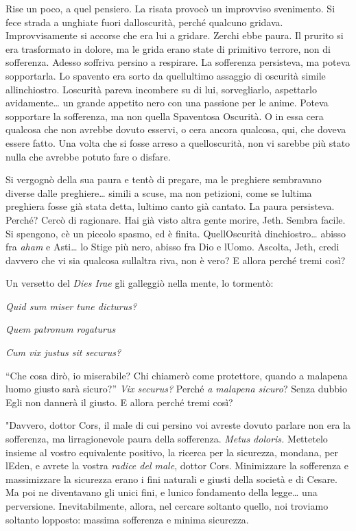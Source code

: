 Rise un poco, a quel pensiero. La risata provocò un improvviso
svenimento. Si fece strada a unghiate fuori
dall\textquotesingle oscurità, perché qualcuno gridava. Improvvisamente
si accorse che era lui a gridare. Zerchi ebbe paura. Il prurito si era
trasformato in dolore, ma le grida erano state di primitivo terrore, non
di sofferenza. Adesso soffriva persino a respirare. La sofferenza
persisteva, ma poteva sopportarla. Lo spavento era sorto da
quell\textquotesingle ultimo assaggio di oscurità simile
all\textquotesingle inchiostro. L\textquotesingle oscurità pareva
incombere su di lui, sorvegliarlo, aspettarlo avidamente\ldots{} un
grande appetito nero con una passione per le anime. Poteva sopportare la
sofferenza, ma non quella Spaventosa Oscurità. O in essa
c\textquotesingle era qualcosa che non avrebbe dovuto esservi, o
c\textquotesingle era ancora qualcosa, qui, che doveva essere fatto. Una
volta che si fosse arreso a quell\textquotesingle oscurità, non vi
sarebbe più stato nulla che avrebbe potuto fare o disfare.

Si vergognò della sua paura e tentò di pregare, ma le preghiere
sembravano diverse dalle preghiere\ldots{} simili a scuse, ma non
petizioni, come se l\textquotesingle ultima preghiera fosse già stata
detta, l\textquotesingle ultimo canto già cantato. La paura persisteva.
Perché? Cercò di ragionare. Hai già visto altra gente morire, Jeth.
Sembra facile. Si spengono, c\textquotesingle è un piccolo spasmo, ed è
finita. Quell\textquotesingle Oscurità
d\textquotesingle inchiostro\ldots{} abisso fra \emph{aham} e
Asti\ldots{} lo Stige più nero, abisso fra Dio e l\textquotesingle Uomo.
Ascolta, Jeth, credi davvero che vi sia qualcosa
sull\textquotesingle altra riva, non è vero? E allora perché tremi così?

Un versetto del \emph{Dies Irae} gli galleggiò nella mente, lo tormentò:

\emph{Quid sum miser tune dicturus?}

\emph{Quem patronum rogaturus}

\emph{Cum vix justus sit securus?}

``Che cosa dirò, io miserabile? Chi chiamerò come protettore, quando a
malapena l\textquotesingle uomo giusto sarà sicuro?'' \emph{Vix
	securus?} Perché \emph{a malapena sicuro}? Senza dubbio Egli non dannerà
il giusto. E allora perché tremi così?

"Davvero, dottor Cors, il male di cui persino voi avreste dovuto parlare
non era la sofferenza, ma l\textquotesingle irragionevole paura della
sofferenza. \emph{Metus doloris.} Mettetelo insieme al vostro
equivalente positivo, la ricerca per la sicurezza, mondana, per
l\textquotesingle Eden, e avrete la vostra \emph{radice del male},
dottor Cors. Minimizzare la sofferenza e massimizzare la sicurezza erano
i fini naturali e giusti della società e di Cesare. Ma poi ne
diventavano gli unici fini, e l\textquotesingle unico fondamento della
legge\ldots{} una perversione. Inevitabilmente, allora, nel cercare
soltanto quello, noi troviamo soltanto l\textquotesingle opposto:
massima sofferenza e minima sicurezza.


